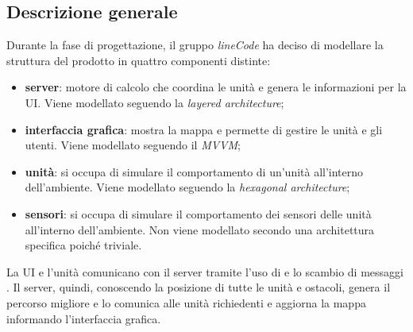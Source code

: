 \subsection{Descrizione generale}
Durante la fase di progettazione, il gruppo \textit{lineCode} ha deciso di modellare la struttura del prodotto in quattro componenti distinte:
\begin{itemize}
	\item \textbf{server}: motore di calcolo che coordina le unità e genera le informazioni per la UI. Viene modellato seguendo la \textit{layered architecture};
	\item \textbf{interfaccia grafica}: mostra la mappa e permette di gestire le unità e gli utenti. Viene modellato seguendo il \textit{MVVM};
	\item \textbf{unità}: si occupa di simulare il comportamento di un'unità all'interno dell'ambiente. Viene modellato seguendo la \textit{hexagonal architecture};
	\item \textbf{sensori}: si occupa di simulare il comportamento dei sensori delle unità all'interno dell'ambiente. Non viene modellato secondo una architettura specifica poiché triviale.
\end{itemize}
La UI e l'unità comunicano con il server tramite l'uso di  e lo scambio di messaggi . Il server, quindi, conoscendo la posizione di tutte le unità e ostacoli, genera il percorso migliore e lo comunica alle unità richiedenti e aggiorna la mappa informando l'interfaccia grafica.\\

